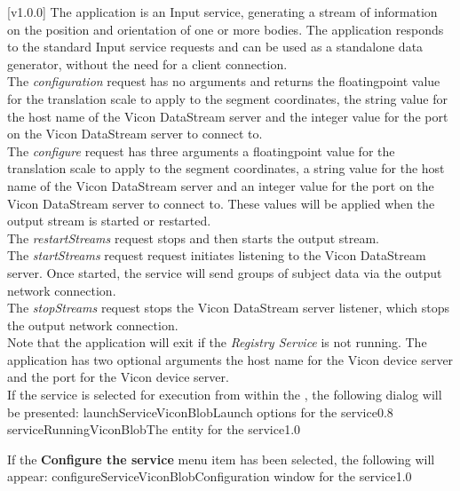 [v1.0.0]
The  application is an Input service,
generating a stream of information on the position and orientation of one or more bodies.
The application responds to the standard Input service requests and can be used as a
standalone data generator, without the need for a client connection.\\

The \emph{configuration} request has no arguments and returns the floating\longDash{}point
value for the translation scale to apply to the segment coordinates, the string value for
the host name of the Vicon DataStream server and the integer value for the port on the
Vicon DataStream server to connect to.\\

The \emph{configure} request has three arguments \longDash{} a floating\longDash{}point
value for the translation scale to apply to the segment coordinates, a string value for
the host name of the Vicon DataStream server and an integer value for the port on the
Vicon DataStream server to connect to.
These values will be applied when the output stream is started or restarted.\\ 

The \emph{restartStreams} request stops and then starts the output stream.\\

The \emph{startStreams} request request initiates listening to the Vicon DataStream
server.
Once started, the service will send groups of subject data via the output \yarp{} network
connection.\\

The \emph{stopStreams} request stops the Vicon DataStream server listener, which stops the
output \yarp{} network connection.\\ 

Note that the application will exit if the \emph{Registry Service} is not running.
The application has two optional arguments \longDash{} the host name for the Vicon device
server and the port for the Vicon device server.
\insertAppParameters
\insertTagDescription{\VDSI}
\insertInputServiceComment\\

\insertStandardServiceCommands
\secondaryEnd
{}
If the service is selected for execution from within the \emph{\MMMU}, the following
dialog will be presented:
%
{launchServiceViconBlob}{Launch options for the \VBI{} service}{0.8}
\condPage
{}%
{serviceRunningViconBlob}{The \emph{\MMMU} entity for the \VBI{} service}{1.0}

If the \textbf{Configure the service} menu item has been selected, the following will
appear:
%
{configureServiceViconBlob}{Configuration window for the \emph{\VBI} service}{1.0}
\secondaryEnd
\primaryEnd{}
